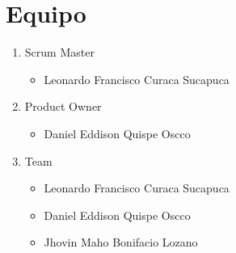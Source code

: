 \chapter{Equipo}
\setlength{\parindent}{0pt}
\begin{enumerate}
	\item Scrum Master
	\begin{itemize}
		\item Leonardo Francisco Curaca Sucapuca
	\end{itemize}
	\item Product Owner
	\begin{itemize}
		\item Daniel Eddison Quispe Oscco
	\end{itemize}
	\item Team
	\begin{itemize}
		\item Leonardo Francisco Curaca Sucapuca
		\item Daniel Eddison Quispe Oscco
		\item Jhovin Maho Bonifacio Lozano
	\end{itemize}
\end{enumerate}
